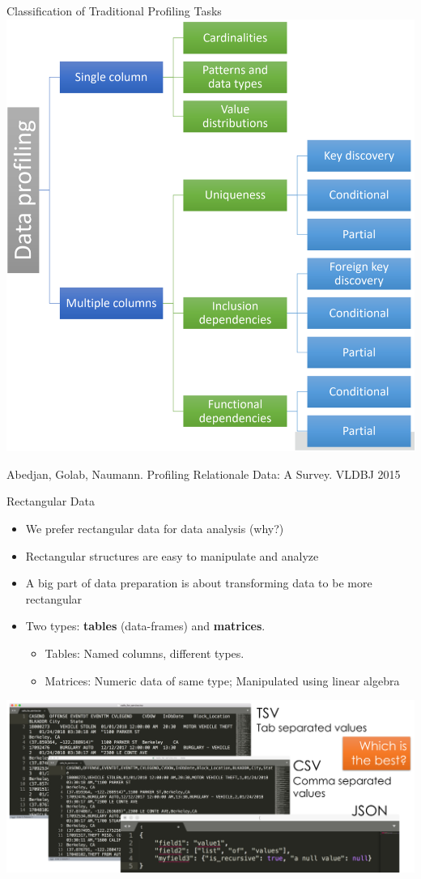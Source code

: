 \documentclass[aspectratio=169]{../latex_main/tntbeamer}  %
\begin{document}
\begin{frame}[c]{Classification of Traditional Profiling Tasks}
    \centering
    \includegraphics[width=.4\textwidth]{bild9_profiling}

    Abedjan, Golab, Naumann. Profiling Relationale Data: A Survey. VLDBJ 2015
\end{frame}

\begin{frame}[c]{Rectangular Data}
    \begin{itemize}
        \item We prefer rectangular data for data analysis (why?) 
        \item Rectangular structures are easy to manipulate and analyze 
        \item A big part of data preparation is about transforming data to be more rectangular
        \item Two types: \textbf{tables} (data-frames) and \textbf{matrices}.
        \begin{itemize}
            \item Tables: Named columns, different types.
            \item Matrices: Numeric data of same type; Manipulated using linear algebra
        \end{itemize}
    \end{itemize}
\end{frame}

\begin{frame}[c]{}
    \includegraphics[width=1.0\textwidth]{bild10_file_formats}
\end{frame}
\end{document}
